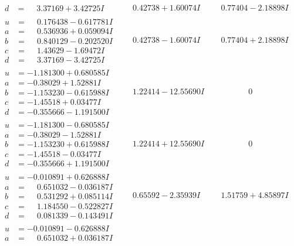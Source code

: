 \documentclass[1p]{elsarticle_modified}
\theoremstyle{definition}
\begin{document}
$$\begin{array}{c|c|c}
\begin{aligned}
d &= \phantom{-}3.37169 + 3.42725 I\end{aligned}
 & \phantom{-}0.42738 + 1.60074 I & \phantom{-}0.77404 - 2.18898 I \\ \hline\begin{aligned}
u &= \phantom{-}0.176438 - 0.617781 I \\
a &= \phantom{-}0.536936 + 0.059094 I \\
b &= \phantom{-}0.840129 - 0.202520 I \\
c &= \phantom{-}1.43629 - 1.69472 I \\
d &= \phantom{-}3.37169 - 3.42725 I\end{aligned}
 & \phantom{-}0.42738 - 1.60074 I & \phantom{-}0.77404 + 2.18898 I \\ \hline\begin{aligned}
u &= -1.181300 + 0.680585 I \\
a &= -0.38029 + 1.52881 I \\
b &= -1.153230 - 0.615988 I \\
c &= -1.45518 + 0.03477 I \\
d &= -0.355666 - 1.191500 I\end{aligned}
 & \phantom{-}1.22414 - 12.55690 I & \phantom{-0.000000 } 0 \\ \hline\begin{aligned}
u &= -1.181300 - 0.680585 I \\
a &= -0.38029 - 1.52881 I \\
b &= -1.153230 + 0.615988 I \\
c &= -1.45518 - 0.03477 I \\
d &= -0.355666 + 1.191500 I\end{aligned}
 & \phantom{-}1.22414 + 12.55690 I & \phantom{-0.000000 } 0 \\ \hline\begin{aligned}
u &= -0.010891 + 0.626888 I \\
a &= \phantom{-}0.651032 - 0.036187 I \\
b &= \phantom{-}0.531292 + 0.085114 I \\
c &= \phantom{-}1.184550 - 0.522827 I \\
d &= \phantom{-}0.081339 - 0.143491 I\end{aligned}
 & \phantom{-}0.65592 - 2.35939 I & \phantom{-}1.51759 + 4.85897 I \\ \hline\begin{aligned}
u &= -0.010891 - 0.626888 I \\
a &= \phantom{-}0.651032 + 0.036187 I \\

\end{aligned}
\end{array}$$
\end{document}
